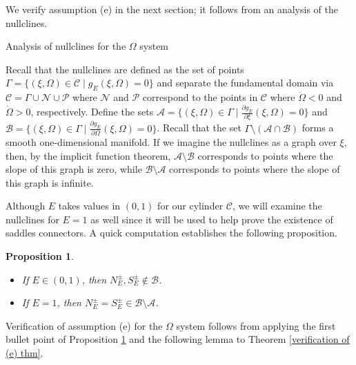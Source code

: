 \documentclass[11 pt]{article}
\newtheorem{prop}[thm]{Proposition}%
\renewcommand\({\left(}
\renewcommand\){\right)}
\newcommand\<{\langle}
\renewcommand\>{\rangle}
\newcommand\8{\infty}
\newcommand{\pd}{\partial}
\newcommand{\mc}{\mathcal}
\begin{document}
We verify assumption (e) in the next section; it follows from an analysis of the nullclines. 

\medskip
\medskip

\begin{subsection}{Analysis of nullclines for the $\Omega$ system}

\end{subsection} 
 

  Recall that the nullclines are defined as the set of points $\Gamma = \big\{(\xi, \Omega) \in \mc{C} \mid g_E(\xi, \Omega) = 0\big\}$ and separate the fundamental domain via $\mc{C} = \Gamma \cup \mc{N} \cup \mc{P}$ where $\mc{N}$ and $\mc{P}$ correspond to the points in $\mc{C}$ where $\dot{\Omega} < 0$ and $\dot{\Omega} > 0$, respectively. Define the sets $\mc{A} = \big\{(\xi,\Omega) \in \Gamma \mid \frac{\pd g_E}{\pd \xi}(\xi, \Omega) = 0 \big\}$ and $\mc{B} = \big\{(\xi, \Omega) \in \Gamma \mid \frac{\pd g_E}{\pd \Omega}(\xi, \Omega) = 0\big\}$. Recall that the set $\Gamma \setminus (\mc{A} \cap \mc{B})$ forms a smooth one-dimensional manifold.  If we imagine the nullclines as a graph over $\xi$, then, by the implicit function theorem, $\mc{A} \setminus \mc{B}$ corresponds to points where the slope of this graph is zero, while $\mc{B} \setminus \mc{A}$ corresponds to points where the slope of this graph is infinite.
 
 Although $E$ takes values in $(0,1)$ for our cylinder $\mc{C}$, we will examine the nullclines for $E = 1$ as well since it will be used to help prove the existence of saddles connectors. A quick computation establishes the following proposition. 

\medskip
\medskip

\begin{prop}\label{equi points for Om prop}\: $\phantom{nix}$
\begin{itemize}
\item[$\bullet$] If $E \in (0,1)$, then $N^\pm_E, S^\pm_E \notin \mc{B}$.
\item[$\bullet$] If $E = 1$, then $N^\pm_E = S^\pm_E \in \mc{B} \setminus \mc{A}$. 
\end{itemize}
\end{prop}

\medskip
\medskip

Verification of assumption (e) for the $\Omega$ system follows from applying the first bullet point of Proposition \ref{equi points for Om prop} and the following lemma to Theorem \ref{verification of (e) thm}. 
\end{document}
